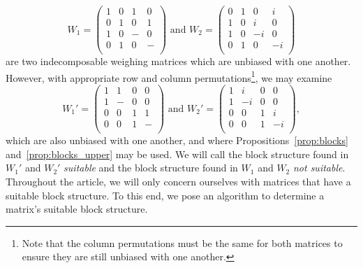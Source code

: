 $$W_1=\left(\begin{array}{cccc}
   1 & 0 & 1 & 0 \\
   0 & 1 & 0 & 1 \\
   1 & 0 & - & 0 \\
   0 & 1 & 0 & - \\
  \end{array}\right) \text{ and }
W_2 = \left(\begin{array}{cccc}
   0 & 1 & 0 & i\\
   1 & 0 & i & 0\\
   1 & 0 & -i & 0\\
   0 & 1 & 0 & -i\\
  \end{array}\right)$$
are two indecomposable weighing matrices which are unbiased with one another. However, with appropriate row and column permutations\footnote{Note that the column permutations must be the same for both matrices to ensure they are still unbiased with one another.}, we may examine
$$W_1'=\left(\begin{array}{cccc}
   1 & 1 & 0 & 0 \\
   1 & - & 0 & 0 \\
   0 & 0 & 1 & 1 \\
   0 & 0 & 1 & - \\
  \end{array}\right) \text{ and }
W_2' = \left(\begin{array}{cccc}
   1 & i & 0 & 0\\
   1 & -i & 0 & 0\\
   0 & 0 & 1 & i\\
   0 & 0 & 1 & -i\\
  \end{array}\right),$$
 which are also unbiased with one another, and where Propositions~\ref{prop:blocks} and~\ref{prop:blocks_upper} may be used. We will call the block structure found in $W_1'$ and $W_2'$ {\it suitable} and the block structure found in $W_1$ and $W_2$ {\it not suitable}. Throughout the article, we will only concern ourselves with matrices that have a suitable block structure. To this end, we pose an algorithm to determine a matrix's suitable block structure.


